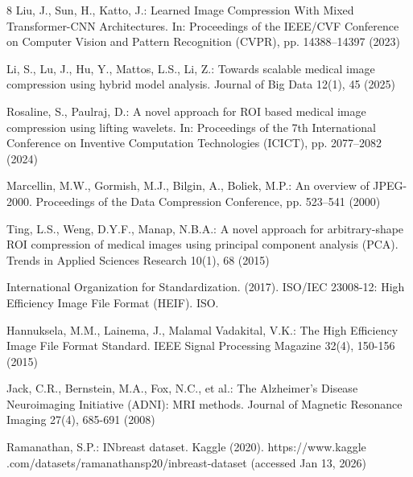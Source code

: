 \documentclass[runningheads]{llncs}
\begin{document}
\begin{thebibliography}{8}
Liu, J., Sun, H., Katto, J.: Learned Image Compression With Mixed Transformer-CNN Architectures. In: Proceedings of the IEEE/CVF Conference on Computer Vision and Pattern Recognition (CVPR), pp. 14388–14397 (2023)

Li, S., Lu, J., Hu, Y., Mattos, L.S., Li, Z.: Towards scalable medical image compression using hybrid model analysis. Journal of Big Data 12(1), 45 (2025)

Rosaline, S., Paulraj, D.: A novel approach for ROI based medical image compression using lifting wavelets. In: Proceedings of the 7th International Conference on Inventive Computation Technologies (ICICT), pp. 2077–2082 (2024) 

Marcellin, M.W., Gormish, M.J., Bilgin, A., Boliek, M.P.: An overview of JPEG-2000. Proceedings of the Data Compression Conference, pp. 523–541 (2000)

Ting, L.S., Weng, D.Y.F., Manap, N.B.A.: A novel approach for arbitrary-shape ROI compression of medical images using principal component analysis (PCA). Trends in Applied Sciences Research 10(1), 68 (2015)

International Organization for Standardization. (2017). ISO/IEC 23008-12: High Efficiency Image File Format (HEIF). ISO.

Hannuksela, M.M., Lainema, J., Malamal Vadakital, V.K.: The High Efficiency Image File Format Standard. IEEE Signal Processing Magazine 32(4), 150-156 (2015)

Jack, C.R., Bernstein, M.A., Fox, N.C., et al.: The Alzheimer's Disease 
Neuroimaging Initiative (ADNI): MRI methods. Journal of Magnetic Resonance 
Imaging 27(4), 685-691 (2008)

Ramanathan, S.P.: INbreast dataset. Kaggle (2020). https://www.kaggle
.com/datasets/ramanathansp20/inbreast-dataset (accessed Jan 13, 2026)

\end{thebibliography}
\end{document}
